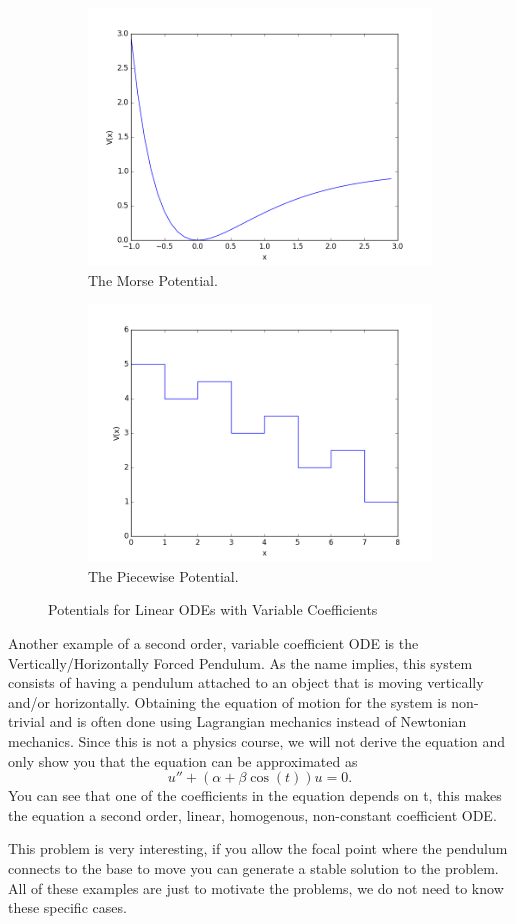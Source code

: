 \documentclass{article}
\newcommand{\be}{\begin{equation}}
\newcommand{\ee}{\end{equation}}
\begin{document}
\begin{figure}[H]
    \centering
    \begin{subfigure}[b]{0.49\textwidth}
        \includegraphics[width=\textwidth]{Figures/morse.png}
  	\caption{The Morse Potential.}
    \end{subfigure}
    \begin{subfigure}[b]{0.49\textwidth}
        \includegraphics[width=\textwidth]{Figures/piecewise.png}
        \caption{The Piecewise Potential.}
    \end{subfigure}
    \caption{Potentials for Linear ODEs with Variable Coefficients}
\end{figure}

Another example of a second order, variable coefficient ODE is the Vertically/Horizontally Forced Pendulum.
As the name implies, this system consists of having a pendulum attached to an object that is moving vertically and/or horizontally.
Obtaining the equation of motion for the system is non-trivial and is often done using Lagrangian mechanics instead of Newtonian mechanics.
Since this is not a physics course, we will not derive the equation and only show you that the equation can be approximated as
\be
u'' + (\alpha + \beta\cos(t)) u = 0 .
\ee
You can see that one of the coefficients in the equation depends on t, this makes the equation a second order, linear, homogenous, non-constant coefficient ODE.

This problem is very interesting, if you allow the focal point where the pendulum connects to the base to move you can generate a stable solution to the problem.
All of these examples are just to motivate the problems, we do not need to know these specific cases.
\end{document}
